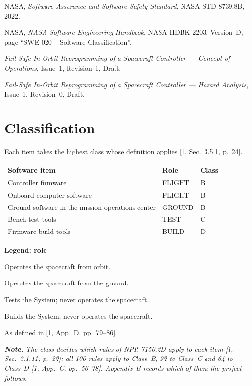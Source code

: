 \documentclass[11pt,a4paper]{article}
\begin{document}
\noindent [2] NASA, \emph{Software Assurance and Software Safety Standard},
NASA-STD-8739.8B, 2022.

\noindent [3] NASA, \emph{NASA Software Engineering Handbook}, NASA-HDBK-2203,
Version~D, page ``SWE-020 -- Software Classification''.

\noindent [4] \emph{Fail-Safe In-Orbit Reprogramming of a Spacecraft
Controller --- Concept of Operations}, Issue~1, Revision~1, Draft.

\noindent [5] \emph{Fail-Safe In-Orbit Reprogramming of a Spacecraft
Controller --- Hazard Analysis}, Issue~1, Revision~0, Draft.

\section{Classification}
Each item takes the highest class whose definition applies
[1, Sec.~3.5.1, p.~24].

\begin{table}[H]
\centering
\begin{tabular}{@{}lll@{}}
\toprule
Software item & Role & Class \\
\midrule
Controller firmware & FLIGHT & B \\
Onboard computer software & FLIGHT & B \\
Ground software in the mission operations center & GROUND & B \\
Bench test tools & TEST & C \\
Firmware build tools & BUILD & D \\
\bottomrule
\end{tabular}
\end{table}

\noindent\textbf{Legend: role}
\begin{description}[leftmargin=2.4cm]
\item[FLIGHT] Operates the spacecraft from orbit.
\item[GROUND] Operates the spacecraft from the ground.
\item[TEST] Tests the System; never operates the spacecraft.
\item[BUILD] Builds the System; never operates the spacecraft.
\item[Class] As defined in [1, App.~D, pp.~79--86].
\end{description}

\medskip
{\itshape \noindent\textbf{Note.} The class decides which rules of NPR 7150.2D
apply to each item [1, Sec.~3.1.11, p.~22]: all 100 rules apply to Class~B,
92 to Class~C and 64 to Class~D [1, App.~C, pp.~56--78]. Appendix~B records
which of them the project follows.\par}
\end{document}
